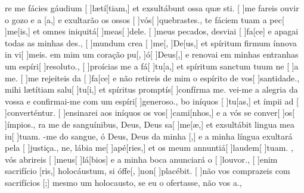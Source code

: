 {  {re me fácies gáudium [ ]{læ}{tí}[tiam,] et exsultábunt ossa quæ sti.}%
    {[ ]{me} fareis ouvir o gozo e a [a,] e exultarão os ossos [ ]{vós}[ ]{que}{bras}tes.},
  {te fáciem tuam a pec[ ]{me}[is,] et omnes iniquitá[ ]{me}{as}[ ]{de}le.}%
    {[ ]{meus} pecados, desviai [ ]{fa}[ce] e apagai todas as minhas des.},
  {[ ]{mun}dum crea [ ]{me}[, ]{De}[us,] et spíritum firmum ínnova in vi[ ]{me}is.}%
    { em mim um coração pu[, ]{ó}[ ]{Deus}[,] e renovai em minhas entranhas um espíri[ ]{re}{so}{lu}to.},
  {[ ]{pro}ícias me a fá[ ]{tu}[a,] et spíritum sanctum tuum ne [ ]{a} me.}%
    {[ ]{me} rejeiteis da [ ]{fa}[ce] e não retireis de mim o espírito de vos[ ]{san}{ti}{da}de.},
  { mihi lætítiam salu[ ]{tu}[i,] et spíritus promptís[ ]{con}{fírma} me.}%
    {vei-me a alegria da vossa  e confir\-mai-me com um espíri[ ]{ge}{ne}{ro}so.},
  {bo iníquos [ ]{tu}[as,] et ímpii ad [ ]{con}{ver}{tén}{\-tur.}}%
    {[ ]{en}sinarei aos iníquos os vos[ ]{ca}{mi}[nhos,] e a vós se conver[ ]{os}[ ]{ím}pios.},
  {ra me de sanguínibus, Deus, Deus sa[ ]{me}[æ,] et exsultábit lingua mea iu[ ]{tu}am.}%
    {-me do sangue, ó Deus, Deus da minha [,] e a minha língua exultará pela [ ]{jus}{ti}ça.},
  {ne, lábia me[ ]{a}{pé}[ries,] et os meum annuntiá[ ]{lau}{dem}[ ]{tu}am.}%
    {, vós abrireis [ ]{meus}[ ]{lá}[bios] e a minha boca anunciará o [ ]{lou}{vor}.},
  {[ ]{e}nim sacrifício [ris,] holocáustum, si óffe[, ]{non}[ ]{pla}{cé}bit.}%
    {[ ]{não} vos comprazeis com sacrifícios [;] mesmo um holocausto, se eu o ofertasse, não vos a.},
}
